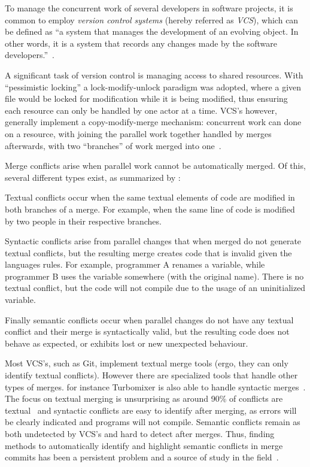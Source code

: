 To manage the concurrent work of several developers in software projects, it is common to employ \emph{version control systems} (hereby referred as \emph{VCS}), which can be defined as ``a system that manages the development of an evolving object. In other words, it is a system that records any changes made by the software developers.''~\cite{kn:vers_review}.

A significant task of version control is managing access to shared resources.
With ``pessimistic locking'' a lock-modify-unlock paradigm was adopted, where a given file would be locked for modification while it is being modified, thus ensuring each resource can only be handled by one actor at a time. VCS's however, generally implement a copy-modify-merge mechanism: concurrent work can done on a resource, with joining the parallel work together handled by merges afterwards, with two ``branches'' of work merged into one~\cite{kn:vers_ott}.

Merge conflicts arise when parallel work cannot be automatically merged. Of this, several different types exist, as summarized by \citet{kn:tmens}:

Textual conflicts occur when the same textual elements of code are modified in both branches of a merge. For example, when the same line of code is modified by two people in their respective branches.

Syntactic conflicts arise from parallel changes that when merged do not generate textual conflicts, but the resulting merge creates code that is invalid given the languages rules. For example, programmer A renames a variable, while programmer B uses the variable somewhere (with the original name). There is no textual conflict, but the code will not compile due to the usage of an uninitialized variable.

Finally semantic conflicts occur when parallel changes do not have any textual conflict and their merge is syntactically valid, but the resulting code does not behave as expected, or exhibits lost or new unexpected behaviour.

Most VCS's, such as Git, implement textual merge tools (ergo, they can only identify textual conflicts). However there are specialized tools that handle other types of merges. for instance Turbomixer is also able to handle syntactic merges~\cite{kn:tmens}. The focus on textual merging is unsurprising as around 90\% of conflicts are textual~\cite{kn:lcsd} and syntactic conflicts are easy to identify after merging, as errors will be clearly indicated and programs will not compile.
Semantic conflicts remain as both undetected by VCS's and hard to detect after merges. Thus, finding methods to automatically identify and highlight semantic conflicts in merge commits has been a persistent problem and a source of study in the field~\cite{kn:nuno,kn:leuson,kn:leuson2}.

